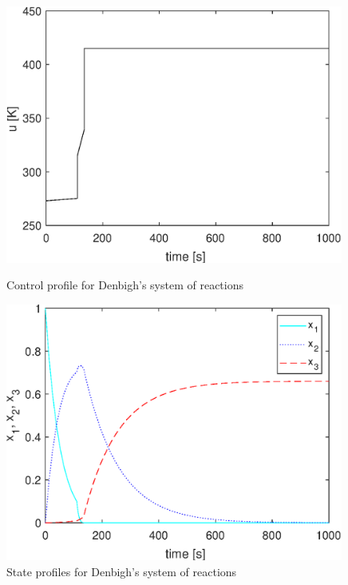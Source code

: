 \begin{figure}[htb]
	\begin{minipage}[t]{0.5\linewidth}
		\centering
		\includegraphics[width=0.99\textwidth]{examples/problem10/graphs/u_denbigh.eps}
		\caption[Denbigh's system of reactions: control profile]{Control profile for
			Denbigh's system of reactions}\label{fig:probdenbigh_u} 
	\end{minipage}
	\begin{minipage}[t]{0.5\linewidth}
		\centering
		\includegraphics[width=0.99\textwidth]{examples/problem10/graphs/x_denbigh.eps}
		\caption[Denbigh's system of reactions: state profiles]{State profiles for Denbigh's system of reactions}\label{fig:probdenbigh_x} 
	\end{minipage}
\end{figure}


